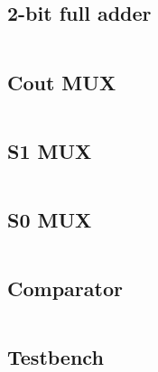 \documentclass{article}
\begin{document}
\pagebreak
\subsection{2-bit full adder}
\inputminted{vhdl}{../src/full_adder_2bit.vhd}

\pagebreak
\subsection{Cout MUX}
\inputminted{vhdl}{../src/Co_mux.vhd}

\pagebreak
\subsection{S1 MUX}
\inputminted{vhdl}{../src/S1_mux.vhd}

\pagebreak
\subsection{S0 MUX}
\inputminted{vhdl}{../src/S0_mux.vhd}

\pagebreak
\subsection{Comparator}
\inputminted{vhdl}{../src/Comparator.vhd}

\pagebreak
\subsection{Testbench}
\inputminted{vhdl}{../test/full_adder_2bit_tb.vhd}

\renewcommand{\thepage}{}
\end{document}
